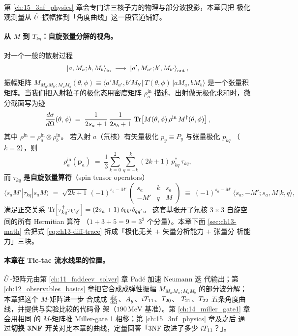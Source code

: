 第 \ref{ch:15_3nf_physics} 章会专门讲三核子力的物理与部分波投影，本章只把
极化观测量从 \(\hat{U}\)-振幅推到「角度曲线」这一段管道铺好。

\paragraph{从 \(M\) 到 \(T_{kq}\)：自旋张量分解的视角。}
对一个一般的散射过程
\begin{equation}
\label{eq:ch13-scattering-process}
\ket{a, M_a; b, M_b}_{\text{in}} \;\longrightarrow\;
\ket{a', M_{a'}; b', M_{b'}}_{\text{out}},
\end{equation}
振幅矩阵
\(M_{M_{a'}M_{b'}; M_a M_b}(\theta,\phi)
\equiv \langle a' M_{a'}, b' M_{b'}|\, T(\theta,\phi)\,|a M_a, b M_b\rangle\)
是一个张量积矩阵。当我们把入射粒子的极化态用密度矩阵
\(\rho_{a}^{\text{in}}\) 描述、出射做无极化求和时，微分截面写为迹
\begin{equation}
\label{eq:ch13-diff-trace}
\frac{d\sigma}{d\Omega}(\theta,\phi)
\;=\; \frac{1}{2 s_a + 1}\,\frac{1}{2 s_b + 1}\,
\Tr\!\left[ M(\theta,\phi)\, \rho^{\text{in}}\, M^\dagger(\theta,\phi)\right],
\end{equation}
其中 \(\rho^{\text{in}} = \rho_a^{\text{in}} \otimes \rho_b^{\text{in}}\)。
若入射 \(a\)（氘核）有矢量极化 \(p_y \equiv P_y\) 与张量极化 \(p_{kq}\)
（\(k=2\)），则
\begin{equation}
\label{eq:ch13-rho-deuteron}
\rho_a^{\text{in}}(\bm{p}_a)
\;=\;
\frac{1}{3}\sum_{k=0}^{2}\sum_{q=-k}^{k}
(2 k + 1)\, p_{kq}^{*}\, \tau_{kq},
\end{equation}
而 \(\tau_{kq}\) 是\textbf{自旋张量算符}（spin tensor operators）
\begin{equation}
\label{eq:ch13-tau-def}
\langle s_a M' | \tau_{kq} | s_a M\rangle
\;=\; \sqrt{2 k + 1}\,(-1)^{s_a - M'}\,
\begin{pmatrix} s_a & k & s_a \\ -M' & q & M \end{pmatrix}
\;\equiv\; (-1)^{s_a - M'}\,
\langle s_a, -M' ; s_a, M | k, q\rangle,
\end{equation}
满足正交关系
\(\Tr[\tau_{kq}^\dagger \tau_{k'q'}] = (2 s_a + 1)\,\delta_{kk'}\delta_{qq'}\)。
这套基张开了氘核 \(3 \times 3\) 自旋空间的所有 Hermitian 算符
（\(1 + 3 + 5 = 9 = 3^2\) 个分量）。本章下面 \cref{sec:ch13-math} 会把式
\eqref{eq:ch13-diff-trace} 拆成「极化无关 \(+\) 矢量分析能力 \(+\) 张量分
析能力」三块。

\paragraph{本章在 Tic-tac 流水线里的位置。}
\(\hat{U}\)-矩阵元由第 \ref{ch:11_faddeev_solver} 章 Padé 加速 Neumann 迭
代输出；第 \ref{ch:12_observables_basics} 章把它合成成弹性振幅
\(M_{M_{a'}M_{b'}; M_a M_b}\) 的部分波分解；本章把这个 \(M\)-矩阵进一步
合成成 \(\frac{d\sigma}{d\Omega}\)、\(A_y\)、\({i T_{11}}\)、\({T_{20}}\)、
\({T_{21}}\)、\({T_{22}}\) 五条角度曲线，并提供与实验比较的代码骨
架（\(190\,\text{MeV}\) 基准）。第 \ref{ch:14_miller_gate1} 章会用相同
的 \(M\)-矩阵推 Miller-gate 1 相移；第 \ref{ch:15_3nf_physics} 章及之后
通过\textbf{切换 3NF 开关}对比本章的曲线，定量回答「3NF 改进了多少
\({i T_{11}}\)？」。

